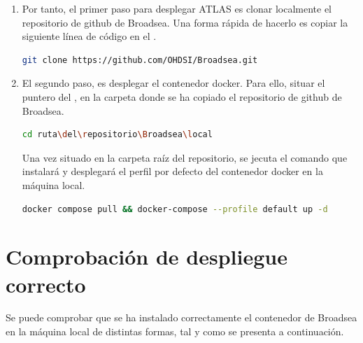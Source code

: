 \begin{enumerate}
    \item Por tanto, el primer paso para desplegar ATLAS es clonar localmente el repositorio de github de Broadsea. Una forma rápida de hacerlo es copiar la siguiente línea de código en el .

\begin{lstlisting}[language=sh]
        git clone https://github.com/OHDSI/Broadsea.git
\end{lstlisting}

    \item El segundo paso, es desplegar el contenedor docker. Para ello, situar el puntero del , en la carpeta donde se ha copiado el repositorio de github de Broadsea.

\begin{lstlisting}[language=sh]
        cd ruta\del\repositorio\Broadsea\local
\end{lstlisting}

    Una vez situado en la carpeta raíz del repositorio, se jecuta el comando que instalará y desplegará el perfil por defecto del contenedor docker en la máquina local.

\begin{lstlisting}[language=sh]
    docker compose pull && docker-compose --profile default up -d
\end{lstlisting}

\end{enumerate}


\section{Comprobación de despliegue correcto} 

Se puede comprobar que se ha instalado correctamente el contenedor de Broadsea en la máquina local de distintas formas, tal y como se presenta a continuación.

